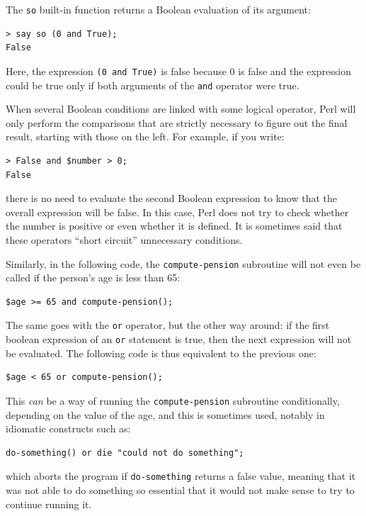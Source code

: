 The {\tt so} built-in function returns a Boolean evaluation of 
its argument:

\begin{verbatim}
> say so (0 and True);
False
\end{verbatim}
%
Here, the expression {\tt (0 and True)} is false because 0 
is false and the expression could be true only if both arguments 
of the {\tt and} operator were true.

When several Boolean conditions are linked with some logical 
operator, Perl will only perform the comparisons that are 
strictly necessary to figure out the final result, starting 
with those on the left. For example, if you write:

\begin{verbatim}
> False and $number > 0;
False
\end{verbatim}
%
there is no need to evaluate the second Boolean expression 
to know that the overall expression will be false. In this case, 
Perl does not try to check whether the number is positive or 
even whether it is defined. It is sometimes said that 
these operators ``short circuit'' unnecessary conditions.

Similarly, in the following code, the {\tt compute-pension} 
subroutine will not even be called if the person's age is 
less than 65:

\begin{verbatim}
$age >= 65 and compute-pension();
\end{verbatim}
%
The same goes with the {\tt or} operator, but the other way 
around: if the first boolean expression of an {\tt or} 
statement is true, then the next expression will not be 
evaluated. The following code is thus equivalent to the previous 
one:

\begin{verbatim}
$age < 65 or compute-pension();
\end{verbatim}
% 
This \emph{can} be a way of running the {\tt compute-pension} 
subroutine conditionally, depending on the value of the age, and 
this is sometimes used, notably in idiomatic constructs such as:

\begin{verbatim}
do-something() or die "could not do something";
\end{verbatim}
%
which aborts the program if {\tt do-something} returns a false 
value, meaning that it was not able to do something 
so essential that it would not make sense to try to continue 
running it.

